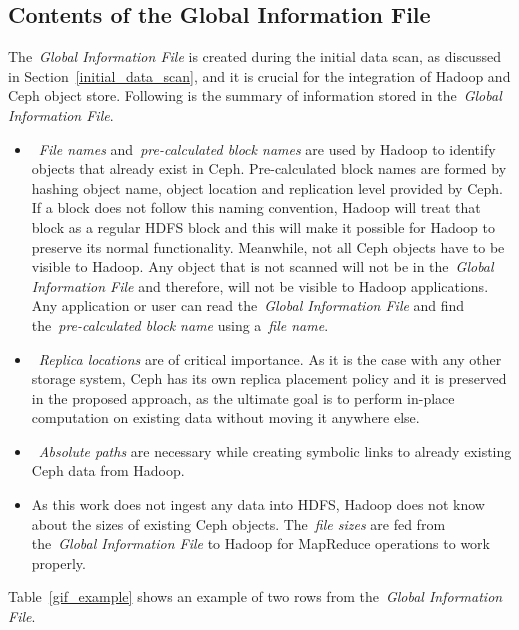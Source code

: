 \documentclass[preprint,12pt]{elsarticle}
\begin{document}
\subsection{Contents of the Global Information File}
\label{global_file_contents}
The~\textit{Global Information File} is created during the initial data scan, as discussed in Section~\ref{initial_data_scan},
and it is crucial for the integration of Hadoop and Ceph object store. Following is the summary of information
stored in the~\textit{Global Information File}.
\begin{itemize}
\item~\textit{File names} and~\textit{pre-calculated block names} are used by Hadoop to identify
objects that already exist in Ceph. Pre-calculated block names are formed by hashing object name, object
location and replication level provided by Ceph. If a block does not follow this naming convention,
Hadoop will treat that block as a regular HDFS block and this will make it possible for Hadoop to
preserve its normal functionality. Meanwhile, not all Ceph objects have to be visible to Hadoop.
Any object that is not scanned will not be in the~\textit{Global Information File} and therefore,
will not be visible to Hadoop applications. Any application or user can read the~\textit{Global
Information File} and find the~\textit{pre-calculated block name} using a~\textit{file name}.
\item~\textit{Replica locations} are of critical importance. As it is the case with any other storage
system, Ceph has its own replica placement policy and it is preserved in the proposed approach,
as the ultimate goal is to perform in-place computation on existing data without moving it anywhere
else.
\item~\textit{Absolute paths} are necessary while creating symbolic links to already existing Ceph data from
Hadoop.
\item As this work does not ingest any data into HDFS, Hadoop does not know about the sizes of
existing Ceph objects. The~\textit{file sizes} are fed from the~\textit{Global Information File} to
Hadoop for MapReduce operations to work properly.
\end{itemize}

Table~\ref{gif_example} shows an example of two rows from the~\textit{Global Information File}.

\begin{table}[!htbp]
 \begin{center}
 \end{center}
 \caption{Example Rows from the~\textit{Global Information File}}
 \label{gif_example}
\end{table}
\end{document}

